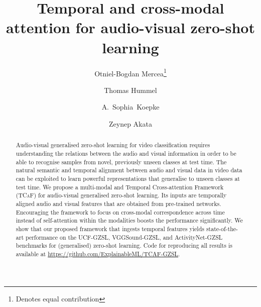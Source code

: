 \documentclass[runningheads]{llncs}
\newcommand{\modelName}{\textsc{TCaF}\xspace}
\newcommand{\activity}{{ActivityNet-GZSL}\xspace}
\newcommand{\ucf}{{UCF-GZSL}\xspace}
\newcommand{\vgg}{{VGGSound-GZSL}\xspace}
\begin{document}
\pagestyle{headings}
\mainmatter
\def\ECCVSubNumber{6942}  

\title{Temporal and cross-modal attention for audio-visual zero-shot learning} 

\begin{comment}
\titlerunning{ECCV-22 submission ID \ECCVSubNumber} 
\authorrunning{ECCV-22 submission ID \ECCVSubNumber} 
\author{Anonymous ECCV submission}
\institute{Paper ID \ECCVSubNumber}
\end{comment}


\newcommand*\samethanks[1][\value{footnote}]{\footnotemark[#1]}
\author{Otniel-Bogdan Mercea\thanks{Denotes equal contribution} \and
Thomas Hummel\samethanks{} \and
\mbox{A. Sophia Koepke} \and
Zeynep Akata}


\maketitle

\begin{abstract}
Audio-visual generalised zero-shot learning for video classification requires understanding the relations between
the audio and visual information in order to be able to recognise samples from novel, previously unseen classes at test time. 
The natural semantic and temporal alignment between audio and visual data in video data can be exploited to learn powerful representations that generalise to unseen classes at test time.
We propose a multi-modal and Temporal Cross-attention Framework (\modelName) for audio-visual generalised zero-shot learning. Its inputs are temporally aligned audio and visual features that are obtained from pre-trained networks. Encouraging the framework to focus on cross-modal correspondence across time instead of self-attention within the modalities boosts the performance significantly. We show that our proposed framework that ingests temporal features yields state-of-the-art performance on the \ucf, \vgg, and \activity benchmarks for (generalised) zero-shot learning. Code for reproducing all results is available at \url{https://github.com/ExplainableML/TCAF-GZSL}.
\end{abstract}
\end{document}
